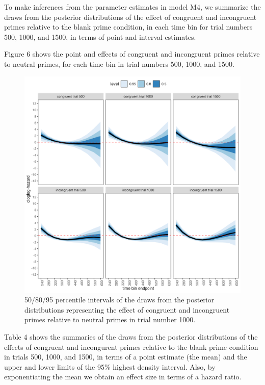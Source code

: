 \documentclass[
  man,floatsintext]{apa6}
\begin{document}
To make inferences from the parameter estimates in model M4, we summarize the draws from the posterior distributions of the effect of congruent and incongruent primes relative to the blank prime condition, in each time bin for trial numbers 500, 1000, and 1500, in terms of point and interval estimates.

Figure 6 shows the point and effects of congruent and incongruent primes relative to neutral primes, for each time bin in trial numbers 500, 1000, and 1500.



\begin{figure}[H]

{\centering \includegraphics[width=0.8\linewidth,height=0.67\textheight,]{../Tutorial_2_Bayesian/figures/M4effects_con_incon_3trials} 

}

\caption{50/80/95 percentile intervals of the draws from the posterior distributions representing the effect of congruent and incongruent primes relative to neutral primes in trial number 1000.}\label{fig:plot-prime-effects}
\end{figure}

Table 4 shows the summaries of the draws from the posterior distributions of the effects of congruent and incongurent primes relative to the blank prime condition in trials 500, 1000, and 1500, in terms of a point estimate (the mean) and the upper and lower limits of the 95\% highest density interval. Also, by exponentiating the mean we obtain an effect size in terms of a hazard ratio.
\end{document}
